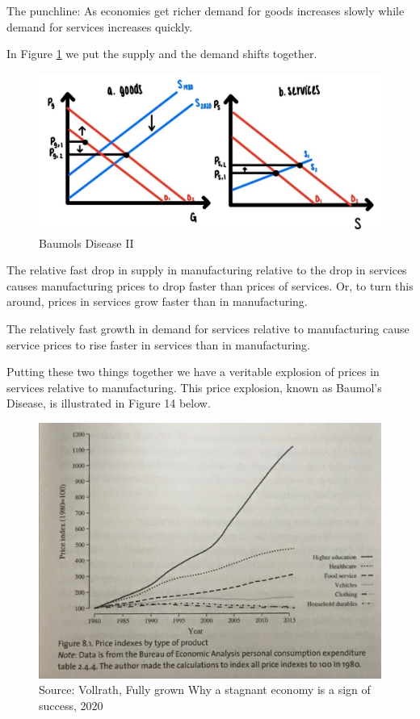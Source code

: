 \documentclass[
]{book}
\begin{document}
The punchline: As economies get richer demand for goods increases slowly while demand for services increases quickly.

In Figure \ref{fig:compmarkets13} we put the supply and the demand shifts together.

\begin{figure}

{\centering \includegraphics[width=1\linewidth]{img/compmarkets/fig13} 

}

\caption{Baumols Disease II}\label{fig:compmarkets13}
\end{figure}

The relative fast drop in supply in manufacturing relative to the drop in services causes manufacturing prices to drop faster than prices of services. Or, to turn this around, prices in services grow faster than in manufacturing.

The relatively fast growth in demand for services relative to manufacturing cause service prices to rise faster in services than in manufacturing.

Putting these two things together we have a veritable explosion of prices in services relative to manufacturing. This price explosion, known as Baumol's Disease, is illustrated in Figure 14 below.

\begin{figure}

{\centering \includegraphics[width=1\linewidth]{img/compmarkets/fig14} 

}

\caption{Source: Vollrath, Fully grown Why a stagnant economy is a sign of success, 2020 }\label{fig:compmarkets14}
\end{figure}
\end{document}
